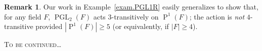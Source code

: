 \documentclass[11pt]{amsart}
\theoremstyle{plain}
\theoremstyle{definition}
\newtheorem*{remark*}{Remark}
\theoremstyle{remark}
\DeclareMathOperator{\PGL}{PGL}
\DeclareMathOperator{\Proj}{P}
\begin{document}
\begin{remark*}
Our work in Example~\ref{exam.PGL1R} easily generalizes to show that, for any field $F$,  $\PGL_2(F)$ acts $3$-transitively on $\Proj^1(F)$; the action is \emph{not} $4$-transitive provided $|\Proj^1(F)| \ge 5$ (or equivalently, if $|F| \ge 4$). 
\end{remark*}









\vfill

\begin{center}
    \textsc{To be continued}\dots
\end{center}

\newpage



\end{document}
